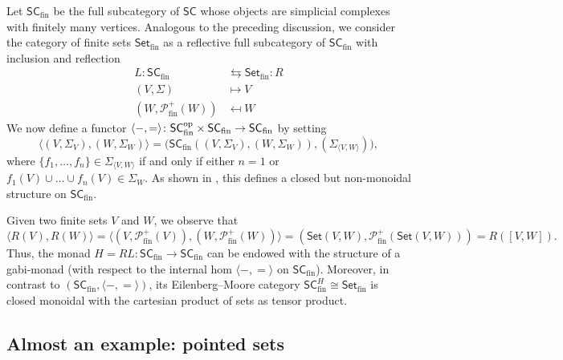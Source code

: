 \documentclass[12pt,dvipsnames,oneside]{amsart}
\theoremstyle{plain}
\theoremstyle{remark}
\theoremstyle{definition}
\newcommand*{\from}{\colon}
\newcommand*{\blank}{{-}}
\newcommand*{\bblank}{{=}}
\newcommand{\Set}{\mathsf{Set}}
\newcommand{\op}{^{\textup{op}}}
\newcommand{\cP}{\mathcal{P}}
\begin{document}
\begin{remark}
  Let \(\mathsf{SC}_{\text{fin}}\) be the full subcategory of \(\mathsf{SC}\) whose objects are simplicial complexes with finitely many vertices.
  Analogous to the preceding discussion, we consider the category of finite sets \(\Set_{\text{fin}}\) as a reflective full subcategory of \(\mathsf{SC}_{\text{fin}}\) with inclusion and reflection
  \begin{align*}
    L \from \mathsf{SC}_{\text{fin}}& \leftrightarrows \Set_{\text{fin}} \colon R \\
    (V, \Sigma)& \mapsto V \\
    (W, \cP_{\mathrm{fin}}^{+}(W)) &\mapsfrom W
  \end{align*}
  We now define a functor \(\langle \blank , \bblank \rangle \from \mathsf{SC}_{\text{fin}}\op\times \mathsf{SC}_{\text{fin}}\to \mathsf{SC}_{\text{fin}}\) by setting
  \begin{equation*}
    \langle (V,\Sigma_{V}), (W, \Sigma_{W}) \rangle = \big(\mathsf{SC}_{\text{fin}}((V,\Sigma_V),(W,\Sigma_W)),(\Sigma_{\langle V,W\rangle}) \big),
  \end{equation*}
  where \(\{f_{1}, \dots , f_{n}\}\in \Sigma_{\langle V, W \rangle}\) if and only if either \(n=1\) or \(f_{1}(V) \cup \dots \cup f_{n}(V) \in \Sigma_{W}\).
  As shown  in \cite[page 561]{Eilenberg-Kelly}, this defines a closed but non-monoidal structure on \(\mathsf{SC}_{\text{fin}}\).

  Given two finite sets \(V\) and \(W\), we observe that
  \begin{equation*}
    \langle R(V), R(W) \rangle
    = \langle (V, \cP_{\mathrm{fin}}^{+}(V)),(W, \cP_{\mathrm{fin}}^{+}(W))\rangle
    = (\Set(V,W), \cP_{\mathrm{fin}}^{+}(\Set(V,W)))
    = R([V,W]).
  \end{equation*}
  Thus, the monad \(H=RL \from \mathsf{SC}_{\text{fin}} \to \mathsf{SC}_{\text{fin}}\) can be endowed with the structure of a gabi-monad (with respect to the internal hom \(\langle \blank , \bblank \rangle\) on \(\mathsf{SC}_{\text{fin}}\)).
  Moreover, in contrast to \((\mathsf{SC}_{\text{fin}}, \langle \blank , \bblank\rangle)\),  its Eilenberg--Moore category \(\mathsf{SC}_{\text{fin}}^{H} \cong \Set_{\text{fin}}\) is closed monoidal with the cartesian product of sets as tensor product.
\end{remark}

\subsection{Almost an example: pointed sets}
\end{document}
